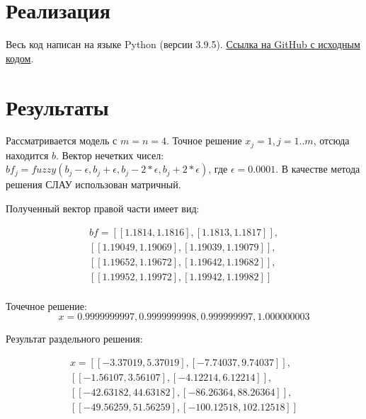 \documentclass[a4paper,12pt]{article}
\begin{document}
    \section{Реализация}
    \quad Весь код написан на языке Python (версии 3.9.5).
    \href{https://github.com/BoIlAl/Intervals/tree/master/course}{Ссылка на GitHub с исходным кодом}.

    \section{Результаты}
    \quad Рассматривается модель с $ m = n = 4 $. Точное решение $ x_j = 1, j = 1..m $, отсюда находится  $ b $. Вектор нечетких чисел: $ bf_j = fuzzy(b_j - \epsilon, b_j + \epsilon, b_j - 2 * \epsilon, b_j + 2 * \epsilon) $, где $ \epsilon = 0.0001 $. В качестве метода решения СЛАУ использован матричный.

    \quad Полученный вектор правой части имеет вид:

    \begin{equation}
        \begin{gathered}
            bf = [[1.1814, 1.1816], [1.1813, 1.1817]], \\
            [[1.19049, 1.19069], [1.19039, 1.19079]],  \\
            [[1.19652, 1.19672], [1.19642, 1.19682]], \\
            [[1.19952, 1.19972], [1.19942, 1.19982]] \\
        \end{gathered}
    \end{equation}
    
    \quad Точечное решение:
    \begin{equation}
        x = 0.9999999997, 0.9999999998, 0.999999997, 1.000000003
    \end{equation}

    \quad Результат раздельного решения:

    \begin{equation}
        \begin{gathered}
            x = [[-3.37019, 5.37019], [-7.74037, 9.74037]], \\
            [[-1.56107, 3.56107], [-4.12214, 6.12214]],  \\
            [[-42.63182, 44.63182], [-86.26364, 88.26364]], \\
            [[-49.56259, 51.56259], [-100.12518, 102.12518]] \\
        \end{gathered}
    \end{equation}
\end{document}
